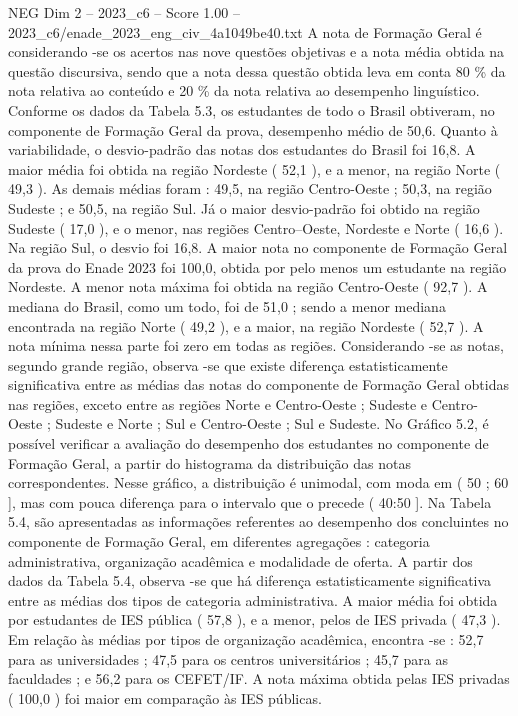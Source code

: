 \begin{textsample}{NEG Dim 2 – 2023\_c6 – Score 1.00 – 2023\_c6/enade\_2023\_eng\_civ\_4a1049be40.txt}
A nota de Formação Geral é considerando -se os acertos nas nove questões objetivas e a nota média obtida na questão discursiva, sendo que a nota dessa questão obtida leva em conta 80 \% da nota relativa ao conteúdo e 20 \% da nota relativa ao desempenho linguístico.
Conforme os dados da Tabela 5.3, os estudantes de todo o Brasil obtiveram, no componente de Formação Geral da prova, desempenho médio de 50,6.
Quanto à variabilidade, o desvio-padrão das notas dos estudantes do Brasil foi 16,8.
A maior média foi obtida na região Nordeste ( 52,1 ), e a menor, na região Norte ( 49,3 ).
As demais médias foram : 49,5, na região Centro-Oeste ; 50,3, na região Sudeste ; e 50,5, na região Sul.
Já o maior desvio-padrão foi obtido na região Sudeste ( 17,0 ), e o menor, nas regiões Centro--Oeste, Nordeste e Norte ( 16,6 ).
Na região Sul, o desvio foi 16,8.
A maior nota no componente de Formação Geral da prova do Enade 2023 foi 100,0, obtida por pelo menos um estudante na região Nordeste.
A menor nota máxima foi obtida na região Centro-Oeste ( 92,7 ).
A mediana do Brasil, como um todo, foi de 51,0 ; sendo a menor mediana encontrada na região Norte ( 49,2 ), e a maior, na região Nordeste ( 52,7 ).
A nota mínima nessa parte foi zero em todas as regiões.
Considerando -se as notas, segundo grande região, observa -se que existe diferença estatisticamente significativa entre as médias das notas do componente de Formação Geral obtidas nas regiões, exceto entre as regiões Norte e Centro-Oeste ; Sudeste e Centro-Oeste ; Sudeste e Norte ; Sul e Centro-Oeste ; Sul e Sudeste.
No Gráfico 5.2, é possível verificar a avaliação do desempenho dos estudantes no componente de Formação Geral, a partir do histograma da distribuição das notas correspondentes.
Nesse gráfico, a distribuição é unimodal, com moda em ( 50 ; 60 ], mas com pouca diferença para o intervalo que o precede ( 40:50 ].
Na Tabela 5.4, são apresentadas as informações referentes ao desempenho dos concluintes no componente de Formação Geral, em diferentes agregações : categoria administrativa, organização acadêmica e modalidade de oferta.
A partir dos dados da Tabela 5.4, observa -se que há diferença estatisticamente significativa entre as médias dos tipos de categoria administrativa.
A maior média foi obtida por estudantes de IES pública ( 57,8 ), e a menor, pelos de IES privada ( 47,3 ).
Em relação às médias por tipos de organização acadêmica, encontra -se : 52,7 para as universidades ; 47,5 para os centros universitários ; 45,7 para as faculdades ; e 56,2 para os CEFET/IF.
A nota máxima obtida pelas IES privadas ( 100,0 ) foi maior em comparação às IES públicas.

\end{textsample}
